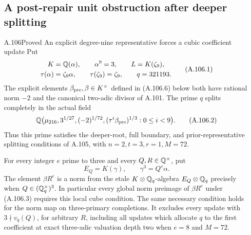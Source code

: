 \subsection{A post-repair unit obstruction after deeper splitting}

\begin{statement}{A.106}{Proved}
{An explicit degree-nine representative forces a cubic coefficient update}
Put
\[
 \begin{gathered}
 K=\mathbb Q(\alpha),\qquad \alpha^9=3,\qquad L=K(\zeta_9),\\
 \tau(\alpha)=\zeta_9\alpha,\qquad\tau(\zeta_9)=\zeta_9,
 \qquad q=321193.
 \end{gathered}
 \tag{A.106.1}
\]
The explicit elements $\beta_{\rm pre},\beta\in K^\times$
defined in (A.106.6) below both have rational norm $-2$
and the canonical two-adic divisor of A.101.
The prime $q$ splits completely in the actual field
\[
 \mathbb Q\bigl(\mu_{216},3^{1/27},(-2)^{1/72},
           (\tau^i\beta_{\rm pre})^{1/3}:0\le i<9\bigr).
 \tag{A.106.2}
\]
Thus this prime satisfies the deeper-root, full boundary,
and prior-representative splitting conditions of A.105,
with $n=2,t=3,r=1,M=72$.

For every integer $e$ prime to three and every
$Q,R\in\mathbb Q^\times$, put
\[
          E_Q=K(\gamma),\qquad \gamma^3=Q^e\alpha.
 \tag{A.106.3}
\]
The element $\beta R^e$ is a norm from the etale
$K\otimes\mathbb Q_q$-algebra $E_Q\otimes\mathbb Q_q$ precisely
when $Q\in(\mathbb Q_q^\times)^3$.
In particular every global norm preimage of $\beta R^e$
under (A.106.3) requires this local cube condition.
The same necessary condition holds for the norm map
on three-primary completions.
It excludes every update with $3\nmid v_q(Q)$,
for arbitrary $R$, including all updates which allocate
$q$ to the first coefficient at exact three-adic
valuation depth two when $e=8$ and $M=72$.
\end{statement}
